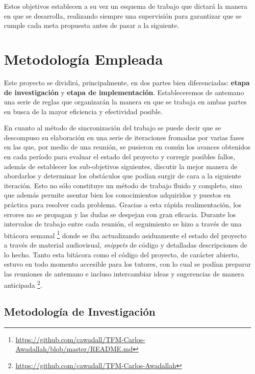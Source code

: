Estos objetivos establecen a su vez un esquema de trabajo que dictará la manera en que se desarrolla, realizando siempre una supervisión para garantizar que se cumple cada meta propuesta antes de pasar a la siguiente.

\section{Metodología Empleada}

Este proyecto se dividirá, principalmente, en dos partes bien diferenciadas: \textbf{etapa de investigación} y \textbf{etapa de implementación}. Estableceremos de antemano una serie de reglas que organizarán la manera en que se trabaja en ambas partes en busca de la mayor eficiencia y efectividad posible.

En cuanto al método de sincronización del trabajo se puede decir que se descompuso su elaboración en una serie de iteraciones fromadas por varias fases en las que, por medio de una reunión, se pusieron en común los avances obtenidos en cada período para evaluar el estado del proyecto y corregir posibles fallos, además de establecer los sub-objetivos siguientes, discutir la mejor manera de abordarlos y determinar los obstáculos que podían surgir de cara a la siguiente iteración. Esto no sólo constituye un método de trabajo fluido y completo, sino que además permite asentar bien los conocimientos adquiridos y puestos en práctica para resolver cada problema. Gracias a esta rápida realimentación, los errores no se propagan y las dudas se despejan con gran eficacia. Durante los intervalos de trabajo entre cada reunión, el seguimiento se hizo a través de una bitácora semanal \footnote{\url{https://github.com/cawadall/TFM-Carlos-Awadallah/blob/master/README.md}} donde se iba actualizando asiduamente el estado del proyecto a través de material audiovisual, \textit{snippets} de código y detalladas descripciones de lo hecho. Tanto esta bitácora como el código del proyecto, de carácter abierto, estuvo en todo momento accesible para los tutores, con lo cual se podían preparar las reuniones de antemano e incluso intercambiar ideas y sugerencias de manera anticipada \footnote{\url{https://github.com/cawadall/TFM-Carlos-Awadallah}}.

\subsection{Metodología de Investigación}


